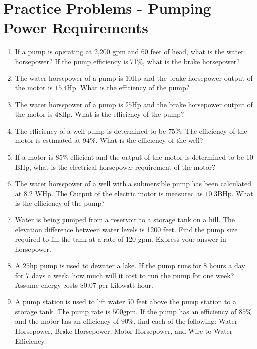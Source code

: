 \section*{Practice Problems - Pumping Power Requirements}
\begin{enumerate}
  \item If a pump is operating at 2,200 gpm and 60 feet of head, what is the water
horsepower? If the pump efficiency is 71\%, what is the brake horsepower?

\item The water horsepower of a pump is $10 \mathrm{Hp}$ and the brake horsepower output of the motor is $15.4 \mathrm{Hp}$. What is the efficiency of the pump?

\item The water horsepower of a pump is $25 \mathrm{Hp}$ and the brake horsepower output of the motor is $48 \mathrm{Hp}$. What is the efficiency of the pump?

\item The efficiency of a well pump is determined to be $75 \%$. The efficiency of the motor is estimated at $94 \%$. What is the efficiency of the well?

\item If a motor is $85 \%$ efficient and the output of the motor is determined to be 10
$\mathrm{BHp}$, what is the electrical horsepower requirement of the motor?

\item The water horsepower of a well with a submersible pump has been calculated at 8.2 WHp. The Output of the electric motor is measured as $10.3 \mathrm{BHp}$. What is the efficiency of the pump?

  \item Water is being pumped from a reservoir to a storage tank on a hill. The elevation difference between water levels is 1200 feet. Find the pump size required to fill the tank at a rate of 120 gpm. Express your answer in horsepower.

  \item A $25 \mathrm{hp}$ pump is used to dewater a lake. If the pump runs for 8 hours a day for 7 days a week, how much will it cost to run the pump for one week? Assume energy costs $\$ 0.07$ per kilowatt hour.

  \item A pump station is used to lift water 50 feet above the pump station to a storage tank. The pump rate is $500 \mathrm{gpm}$. If the pump has an efficiency of $85 \%$ and the motor has an efficiency of $90 \%$, find each of the following: Water Horsepower, Brake Horsepower, Motor Horsepower, and Wire-to-Water Efficiency.



\end{enumerate}
